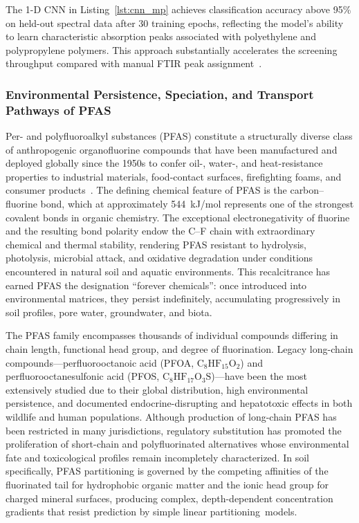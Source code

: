 \documentclass[environremediat,article,accept,pdftex,oneauthor]{Definitions/mdpi}
\begin{document}
The 1-D CNN in Listing~\ref{lst:cnn_mp} achieves classification accuracy
above 95\% on held-out spectral data after 30 training epochs, reflecting
the model's ability to learn characteristic absorption peaks associated
with polyethylene and polypropylene polymers. This approach substantially
accelerates the screening throughput compared with manual FTIR peak
assignment~\cite{Chen2020,LindhLemenkova2023e}.

\subsubsection{Environmental Persistence, Speciation, and Transport Pathways
    of PFAS}\label{sec2.1.4}

{Per- and polyfluoroalkyl substances (PFAS) constitute
a structurally diverse class of anthropogenic organofluorine compounds
that have been manufactured and deployed globally since the 1950s to
confer oil-, water-, and heat-resistance properties to industrial
materials, food-contact surfaces, firefighting foams, and consumer
products}~\cite{Brusseau}. The defining chemical feature of PFAS is the
carbon--fluorine bond, which at approximately 544~kJ/mol represents
one of the strongest covalent bonds in organic chemistry. The
exceptional electronegativity of fluorine and the resulting bond
polarity endow the C--F chain with extraordinary chemical and thermal
stability, rendering PFAS resistant to hydrolysis, photolysis,
microbial attack, and oxidative degradation under conditions
encountered in natural soil and aquatic environments. This
recalcitrance has earned PFAS the designation ``forever chemicals'':
once introduced into environmental matrices, they persist
indefinitely, accumulating progressively in soil profiles, pore water,
groundwater, and biota.

The PFAS family encompasses thousands of individual compounds
differing in chain length, functional head group, and degree of
fluorination. Legacy long-chain compounds---perfluorooctanoic acid
(PFOA, $\mathrm{C_8HF_{15}O_2}$) and perfluorooctanesulfonic acid
(PFOS, $\mathrm{C_8HF_{17}O_3S}$)---have been the most extensively
studied due to their global distribution, high environmental
persistence, and documented endocrine-disrupting and hepatotoxic
effects in both wildlife and human populations. {Although production of
long-chain PFAS has been restricted in many jurisdictions, regulatory
substitution has promoted the proliferation of short-chain and
polyfluorinated alternatives whose environmental fate and toxicological
profiles remain incompletely characterized. In soil specifically, PFAS
partitioning is governed by the competing affinities of the
fluorinated tail for hydrophobic organic matter and the ionic head
group for charged mineral surfaces, producing complex,
depth-dependent concentration gradients that resist prediction by
simple linear \mbox{partitioning models}}.
\end{document}
